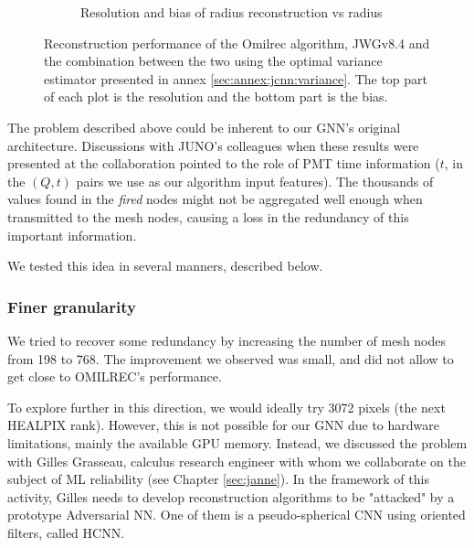 \documentclass[../main.tex]{subfiles}
\begin{document}
\begin{figure}[ht]
\begin{subfigure}[t]{0.48\linewidth}
    \caption{Resolution and bias of radius reconstruction vs radius}
    \label{fig:jgnn:MSBvRTC}
  \end{subfigure}
  \caption{Reconstruction performance of the Omilrec algorithm, JWGv8.4 and the combination between the two using the optimal variance estimator presented in annex \ref{sec:annex:jcnn:variance}. The top part of each plot is the resolution and the bottom part is the bias.}
  \label{fig:jgnn:results_2}
\end{figure}

The problem described above could be inherent to our GNN's original architecture. Discussions with JUNO's colleagues when these results were presented at the collaboration pointed to the role of PMT time information ($t$, in the $(Q,t)$ pairs we use as our algorithm input features). The thousands of values found in the \textit{fired} nodes might not be aggregated well enough when transmitted to the mesh nodes, causing a loss in the redundancy of this important information.

We tested this idea in several manners, described below.

\subsubsection{Finer granularity}

We tried to recover some redundancy by increasing the number of mesh nodes from 198 to 768. The improvement we observed was small, and did not allow to get close to OMILREC's performance.

To explore further in this direction, we would ideally try 3072 pixels (the next HEALPIX rank). However, this is not possible for our GNN due to hardware limitations, mainly the available GPU memory. Instead, we discussed the problem with Gilles Grasseau, calculus research engineer with whom we collaborate on the subject of ML reliability (see Chapter \ref{sec:janne}). In the framework of this activity, Gilles needs to develop reconstruction algorithms to be "attacked" by a prototype Adversarial NN. One of them is a pseudo-spherical CNN using oriented filters, called HCNN.
\end{document}
